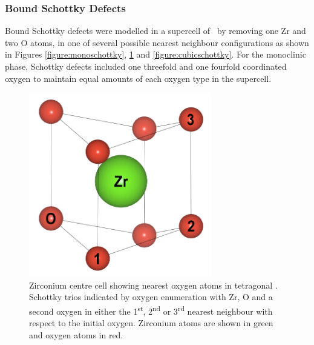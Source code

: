 \subsubsection{Bound Schottky Defects}

Bound Schottky defects were modelled in a supercell of \zirconia\ by removing one Zr and two O atoms, in one of several possible nearest neighbour configurations as shown in Figures \ref{figure:monoschottky}, \ref{figure:tetschottky} and \ref{figure:cubicschottky}. For the monoclinic phase, Schottky defects included one threefold and one fourfold coordinated oxygen to maintain equal amounts of each oxygen type in the supercell.

\begin{figure}[ht] %
\centering
\includegraphics[width=8cm]{images/zr_centre_tet.png}
\caption{Zirconium centre  cell showing nearest oxygen atoms in tetragonal \zirconia. Schottky trios indicated by oxygen enumeration with Zr, O and a second oxygen in either the 1\textsuperscript{st}, 2\textsuperscript{nd} or 3\textsuperscript{rd} nearest neighbour with respect to the initial oxygen. Zirconium atoms are shown in green and oxygen atoms in red.}
\label{figure:tetschottky}
\end{figure}

